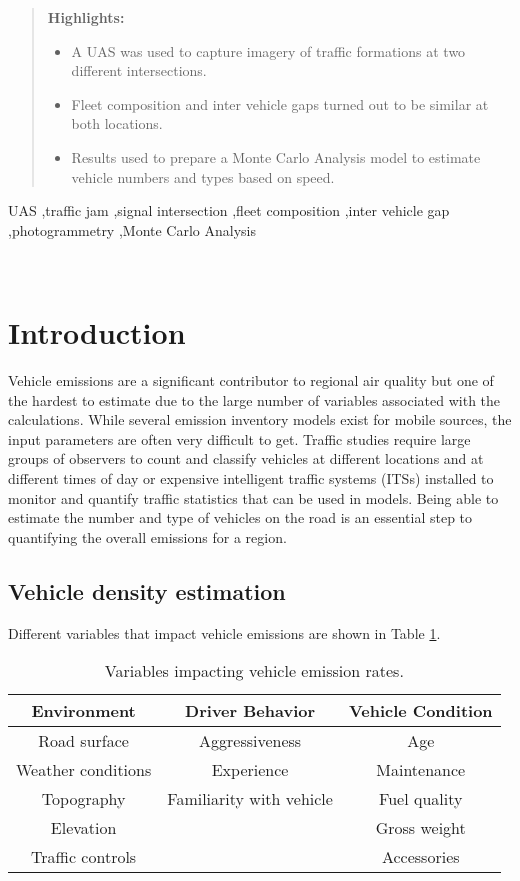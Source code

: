 \documentclass[preprint,12pt,a4paper,authoryear]{elsarticle}
\begin{document}
\begin{linenumbers}
\begin{frontmatter}
\begin{abstract}
\textbf{Highlights:}
\begin{itemize}
  \item A UAS was used to capture imagery of traffic formations at two different intersections.
  \item Fleet composition and inter vehicle gaps turned out to be similar at both locations.
  \item Results used to prepare a Monte Carlo Analysis model to estimate vehicle numbers and types based on speed.
 
\end{itemize}

\end{abstract}

\begin{keyword}
UAS \sep traffic jam \sep signal intersection \sep fleet composition \sep inter vehicle gap \sep photogrammetry \sep Monte Carlo Analysis
\end{keyword}

\end{frontmatter}
 
\section{Introduction}


Vehicle emissions are a significant contributor to regional air quality but one of the hardest to estimate due to the large number of variables associated with the calculations. While several emission inventory models exist for mobile sources, the input parameters are often very difficult to get. Traffic studies require large groups of observers to count and classify vehicles at different locations and at different times of day or expensive intelligent traffic systems (ITSs) installed to monitor and quantify traffic statistics that can be used in models. Being able to estimate the number and type of vehicles on the road is an essential step to quantifying the overall emissions for a region. 

\subsection{Vehicle density estimation}
Different variables that impact vehicle emissions are shown in Table \ref{tb:vehvariables}.  

\begin{table}[H]
\centering
\caption{Variables impacting vehicle emission rates.}
\label{tb:vehvariables}
\begin{tabular}{@{}ccc@{}}
\toprule
\textbf{Environment} & \textbf{Driver Behavior} & \textbf{Vehicle Condition} \\ \midrule
Road surface & Aggressiveness & Age \\
Weather conditions & Experience & Maintenance \\
Topography & Familiarity with vehicle & Fuel quality \\
Elevation &  & Gross weight \\
Traffic controls &  & Accessories \\ \bottomrule
\end{tabular}
\end{table}


\end{linenumbers}
\end{document}
